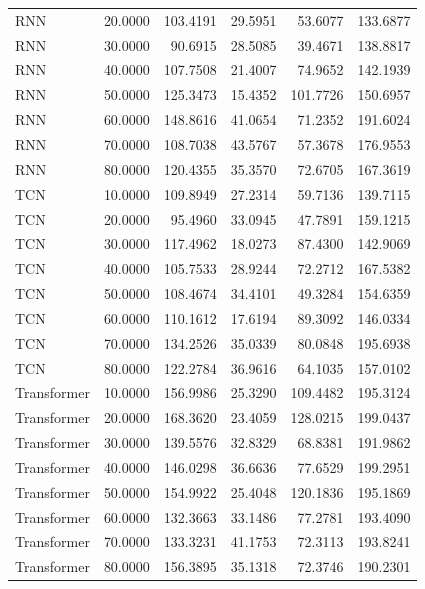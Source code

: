 \begin{tabular}{lrrrrr}
RNN & 20.0000 & 103.4191 & 29.5951 & 53.6077 & 133.6877 \\
RNN & 30.0000 & 90.6915 & 28.5085 & 39.4671 & 138.8817 \\
RNN & 40.0000 & 107.7508 & 21.4007 & 74.9652 & 142.1939 \\
RNN & 50.0000 & 125.3473 & 15.4352 & 101.7726 & 150.6957 \\
RNN & 60.0000 & 148.8616 & 41.0654 & 71.2352 & 191.6024 \\
RNN & 70.0000 & 108.7038 & 43.5767 & 57.3678 & 176.9553 \\
RNN & 80.0000 & 120.4355 & 35.3570 & 72.6705 & 167.3619 \\
TCN & 10.0000 & 109.8949 & 27.2314 & 59.7136 & 139.7115 \\
TCN & 20.0000 & 95.4960 & 33.0945 & 47.7891 & 159.1215 \\
TCN & 30.0000 & 117.4962 & 18.0273 & 87.4300 & 142.9069 \\
TCN & 40.0000 & 105.7533 & 28.9244 & 72.2712 & 167.5382 \\
TCN & 50.0000 & 108.4674 & 34.4101 & 49.3284 & 154.6359 \\
TCN & 60.0000 & 110.1612 & 17.6194 & 89.3092 & 146.0334 \\
TCN & 70.0000 & 134.2526 & 35.0339 & 80.0848 & 195.6938 \\
TCN & 80.0000 & 122.2784 & 36.9616 & 64.1035 & 157.0102 \\
Transformer & 10.0000 & 156.9986 & 25.3290 & 109.4482 & 195.3124 \\
Transformer & 20.0000 & 168.3620 & 23.4059 & 128.0215 & 199.0437 \\
Transformer & 30.0000 & 139.5576 & 32.8329 & 68.8381 & 191.9862 \\
Transformer & 40.0000 & 146.0298 & 36.6636 & 77.6529 & 199.2951 \\
Transformer & 50.0000 & 154.9922 & 25.4048 & 120.1836 & 195.1869 \\
Transformer & 60.0000 & 132.3663 & 33.1486 & 77.2781 & 193.4090 \\
Transformer & 70.0000 & 133.3231 & 41.1753 & 72.3113 & 193.8241 \\
Transformer & 80.0000 & 156.3895 & 35.1318 & 72.3746 & 190.2301 \\
\bottomrule
\end{tabular}
